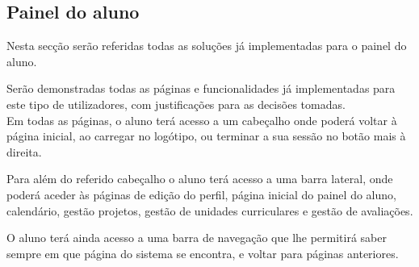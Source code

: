\subsection{Painel do aluno}

Nesta secção serão referidas todas as soluções já implementadas para o painel do aluno.

Serão demonstradas todas as páginas e funcionalidades já implementadas para este tipo de utilizadores, com justificações para as decisões tomadas.\\

Em todas as páginas, o aluno terá acesso a um cabeçalho onde poderá voltar à página inicial, ao carregar no logótipo, ou terminar a sua sessão no botão mais à direita.

Para além do referido cabeçalho o aluno terá acesso a uma barra lateral, onde poderá aceder às páginas de edição do perfil, página inicial do painel do aluno, calendário, gestão projetos, gestão de unidades curriculares e gestão de avaliações.

O aluno terá ainda acesso a uma barra de navegação que lhe permitirá saber sempre em que página do sistema se encontra, e voltar para páginas anteriores.








